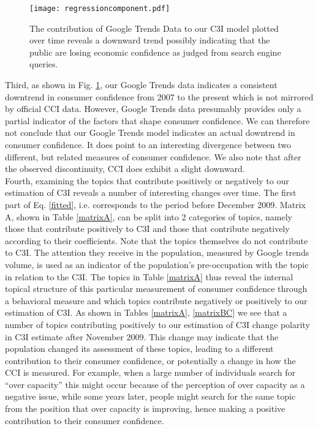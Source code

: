 \documentclass[10pt]{article}
\begin{document}
 	\begin{figure}[h!]
	\begin{center}
                \texttt{[image: regressioncomponent.pdf]}
\caption{ \label{regressionComponent}  The contribution of Google Trends Data to our C3I model plotted over time reveals a downward trend possibly indicating that the public are losing economic confidence as judged from search engine queries.}
	\end{center}
	\end{figure}


Third, as shown in Fig. \ref{regressionComponent}, our Google Trends data indicates a consistent downtrend in consumer confidence from 2007 to the present which is not mirrored by official CCI data. However, Google Trends data presumably provides only a partial indicator of the factors that shape consumer confidence. We can therefore not conclude that our Google Trends model indicates an actual downtrend in consumer confidence. It does point to an interesting divergence between two different, but related measures of consumer confidence. We also note that after the observed discontinuity, CCI does exhibit a slight downward.\\

Fourth, examining the topics that contribute positively or negatively to our estimation of C3I reveals a number of interesting changes over time.
The first part of Eq. \ref{fitted}, i.e.  corresponds to the period before December 2009. Matrix A, shown in Table \ref{matrixA}, can be split into 2 categories of topics, namely those that contribute positively to C3I and those that contribute negatively according to their coefficients. Note that the topics themselves do not contribute to C3I. The attention they receive in the population, measured by Google trends volume, is used as an indicator of the population's pre-occupation with the topic in relation to the C3I. The topics in Table \ref{matrixA} thus reveal the internal topical structure of this particular measurement of consumer confidence through a behavioral measure and which topics contribute negatively or positively to our estimation of C3I. As shown in Tables \ref{matrixA}, \ref{matrixBC} we see that a number of topics contributing positively to our estimation of C3I change polarity in C3I estimate after November 2009. This change may indicate that the population changed its assessment of these topics, leading to a different contribution to their consumer confidence, or potentially a change in how the CCI is measured. For example, when a large number of individuals search for ``over capacity'' this might occur because of the perception of over capacity as a negative issue, while some years later, people might search for the same topic from the position that over capacity is improving,  hence making a positive contribution to their consumer confidence. \\
\end{document}
